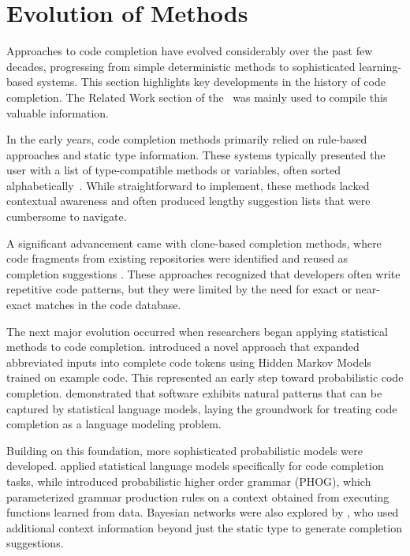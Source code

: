 \section{Evolution of Methods}\label{sec:evolution-of-code-completion}

\begin{sloppypar}
Approaches to code completion have evolved considerably over the past few decades, progressing from simple deterministic methods to sophisticated learning-based systems. This section highlights key developments in the history of code completion. The Related Work section of the~\citet{ciniselli2021} was mainly used to compile this valuable information.
\end{sloppypar}

In the early years, code completion methods primarily relied on rule-based approaches and static type information. These systems typically presented the user with a list of type-compatible methods or variables, often sorted alphabetically~\parencite{mandelin2005}. While straightforward to implement, these methods lacked contextual awareness and often produced lengthy suggestion lists that were cumbersome to navigate.

A significant advancement came with clone-based completion methods, where code fragments from existing repositories were identified and reused as completion suggestions \parencite{hill2004}. These approaches recognized that developers often write repetitive code patterns, but they were limited by the need for exact or near-exact matches in the code database.

The next major evolution occurred when researchers began applying statistical methods to code completion. \citet{han2009} introduced a novel approach that expanded abbreviated inputs into complete code tokens using Hidden Markov Models trained on example code. This represented an early step toward probabilistic code completion. \citet{hindle2012} demonstrated that software exhibits natural patterns that can be captured by statistical language models, laying the groundwork for treating code completion as a language modeling problem.

Building on this foundation, more sophisticated probabilistic models were developed. \citet{raychev2014} applied statistical language models specifically for code completion tasks, while \citet{bielik2016} introduced probabilistic higher order grammar (PHOG), which parameterized grammar production rules on a context obtained from executing functions learned from data. Bayesian networks were also explored by \citet{proksch2015}, who used additional context information beyond just the static type to generate completion suggestions.

